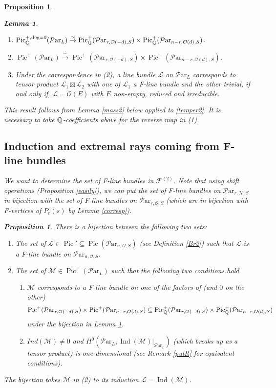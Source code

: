 \documentclass[11pt]{amsart}
\newcommand\op{\operatorname}
\newcommand\mf{\mathcal{F}}
\newcommand\Pic{\operatorname{Pic}}
\newcommand\ml{\mathcal{L}}
\newcommand\ParL{\mathcal{P}\text{ar}_L}
\newcommand\Par{\mathcal{P}\text{ar} }
\newcommand{\leto}[1]{\stackrel{#1}{\to}}
\newtheorem{proposition}[theorem]{Proposition}
\newtheorem{lemma}[theorem]{Lemma}
\numberwithin{theorem}{subsection}
\begin{document}
{\begin{proposition}
\begin{lemma}\label{BachMass}
\begin{enumerate}
\item  $\Pic^{+,\deg=0}_{\Bbb{Q}}(\ParL)\leto{\sim}\Pic^+_{\Bbb{Q}}(\Par_{r,\mathcal{O}(-d),S})\times \Pic^+_{\Bbb{Q}}(\Par_{n-r,\mathcal{O}(d),S})$.
\item $\Pic^{+}(\ParL)\leto{\sim}\Pic^+(\Par_{r,\mathcal{O}(-d),S})\times \Pic^+(\Par_{n-r,\mathcal{O}(d),S})$.
\item Under the correspondence in (2), a line bundle $\ml$ on $\ParL$ corresponds to tensor product $\ml_1\boxtimes\ml_2$ with one of $\ml_1$ a F-line bundle and the other trivial, if and only if,
$\ml=\mathcal{O}(E)$ with $E$ non-empty, reduced and irreducible.

\end{enumerate}
\end{lemma}
This result follows from Lemma \ref{mass2} below applied to \eqref{temper2}.
It is necessary to take $\Bbb{Q}$-coefficients above for the reverse map in (1).






\subsection{Induction and extremal rays coming from F-line bundles}
We want to determine the set of F-line bundles in $\mf^{(2)}$. Note that using shift operations (Proposition \ref{easily}), we can put the set of F-line bundles on $\Par_{r,\mathcal{N},S}$ in bijection with the set of F-line bundles
on   $\Par_{r,\mathcal{O},S}$ (which are in bijection with F-vertices of $P_r(s)$ by Lemma \ref{corresp}).
\begin{proposition}\label{condensed}
There is a bijection between the following two sets:
\begin{enumerate}
\item The set of  $\ml\in \Pic'\subseteq\Pic(\Par_{n,\mathcal{O},S})$ (see Definition  \ref{Br2}) such that $\ml$ is a F-line bundle on  $\Par_{n,\mathcal{O},S}$.
\item The set of $\mathcal{M}\in  \Pic^{+}(\ParL)$ such that the following two conditions hold
\begin{enumerate}
\item[(a)]$\mathcal{M}$ corresponds to a F-line bundle on one of the factors of (and $0$ on the other)
$$\Pic^+(\Par_{r,\mathcal{O}(-d),S})\times \Pic^+(\Par_{n-r,\mathcal{O}(d),S})\subseteq \Pic^+_{\Bbb{Q}}(\Par_{r,\mathcal{O}(-d),S})\times \Pic^+_{\Bbb{Q}}(\Par_{n-r,\mathcal{O}(d),S}) $$ under the  bijection in Lemma \ref{BachMass}.
\item[(b)] $Ind(\mathcal{M})\neq 0$ and $H^0(\ParL,\op{Ind}(\mathcal{M})|_{\ParL})$ (which breaks up as a tensor product)  is one-dimensional (see Remark \ref{putR} for equivalent conditions).
\end{enumerate}
\end{enumerate}
The bijection takes $\mathcal{M}$ in (2) to its induction $\ml=\op{Ind}(\mathcal{M})$.
\end{proposition}


\end{proposition}}
\end{document}
